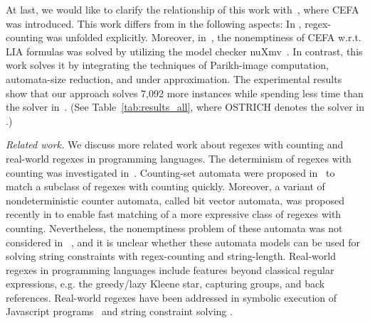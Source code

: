 At last, we would like to clarify the relationship of this work with~\cite{atva2020}, where CEFA was introduced. This work differs from \cite{atva2020} in the following aspects: In \cite{atva2020}, regex-counting was unfolded explicitly. Moreover, in~\cite{atva2020}, the nonemptiness of CEFA w.r.t. LIA formulas was solved by utilizing the model checker nuXmv~\cite{nuxmv}. In contrast, this work solves it by integrating the techniques of Parikh-image computation, automata-size reduction, and under approximation. The experimental results show that our approach solves 7,092 more instances while spending less time than the solver in~\cite{atva2020}. (See Table~\ref{tab:results_all}, where OSTRICH denotes the solver in \cite{atva2020}.)

\medskip
\noindent
\emph{Related work.} 
We discuss more related work about regexes with counting and real-world regexes in programming languages.  
The determinism of regexes with counting was investigated in~\cite{GGM12,CL15}. Counting-set automata were proposed in~\cite{redos_lenka,HS+23} to match a subclass of regexes with counting quickly. Moreover, a variant of nondeterministic counter automata, called bit vector automata, was proposed recently in \cite{GKM23} to enable fast matching of a more expressive class of regexes with counting.   Nevertheless, the nonemptiness problem of these automata was not considered in ~\cite{redos_lenka,HS+23,GKM23}, and it is unclear whether these automata models can be used for solving string constraints with regex-counting and string-length.
Real-world regexes in programming languages include features beyond classical regular expressions, e.g. the greedy/lazy Kleene star, capturing groups, and back references. Real-world regexes have been addressed in symbolic execution of Javascript programs~\cite{LMK19} and string constraint solving \cite{CF+22}. 


